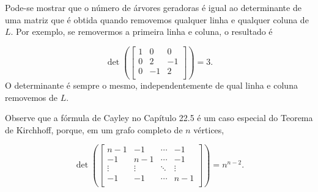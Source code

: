 Pode-se mostrar que
o número de árvores geradoras é igual
ao determinante de uma matriz que é obtida
quando removemos qualquer linha e qualquer coluna de $L$.
Por exemplo, se removermos a primeira linha
e coluna, o resultado é

\[ \det(
\begin{bmatrix}
  1 & 0 & 0 \\
  0 & 2 & -1 \\
  0 & -1 & 2 \\
 \end{bmatrix}
) =3.\]
O determinante é sempre o mesmo,
independentemente de qual linha e coluna removemos de $L$.

Observe que a fórmula de Cayley no Capítulo 22.5 é
um caso especial do Teorema de Kirchhoff,
porque, em um grafo completo de $n$ vértices,

\[ \det(
\begin{bmatrix}
  n-1 & -1 & \cdots & -1 \\
  -1 & n-1 & \cdots & -1 \\
  \vdots & \vdots & \ddots & \vdots \\
  -1 & -1 & \cdots & n-1 \\
 \end{bmatrix}
) =n^{n-2}.\]



